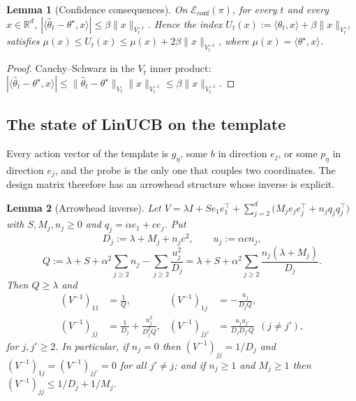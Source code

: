 \documentclass{article}
\newtheorem{lemma}{Lemma}
\theoremstyle{definition}
\theoremstyle{remark}
\newcommand{\R}{\mathbb{R}}
\theoremstyle{remark}
\begin{document}
\begin{lemma}[Confidence consequences]
\label{lem:cat-conf}
On $\mathcal E_{\mathrm{conf}}(\pi)$, for every $t$ and every $x\in\R^d$,
$|\langle\widehat\theta_t-\theta^\star,x\rangle|\le\beta\|x\|_{V_t^{-1}}$.
Hence the index $U_t(x):=\langle\widehat\theta_t,x\rangle+\beta\|x\|_{V_t^{-1}}$
satisfies $\mu(x)\le U_t(x)\le\mu(x)+2\beta\|x\|_{V_t^{-1}}$, where
$\mu(x)=\langle\theta^\star,x\rangle$.
\end{lemma}

\begin{proof}
Cauchy--Schwarz in the $V_t$ inner product:
$|\langle\widehat\theta_t-\theta^\star,x\rangle|\le\|\widehat\theta_t-\theta^\star\|_{V_t}\|x\|_{V_t^{-1}}\le\beta\|x\|_{V_t^{-1}}$.
\end{proof}

\subsection{The state of LinUCB on the template}

Every action vector of the template is $g_\eta$, some $b$ in direction $e_j$,
or some $p_\eta$ in direction $e_j$, and the probe is the only one that couples
two coordinates. The design matrix therefore has an arrowhead structure whose
inverse is explicit.

\begin{lemma}[Arrowhead inverse]
\label{lem:arrowhead}
Let $V=\lambda I+Se_1e_1^\top+\sum_{j=2}^{d}\bigl(M_je_je_j^\top+n_jq_jq_j^\top\bigr)$
with $S,M_j,n_j\ge0$ and $q_j=\alpha e_1+ce_j$. Put
\[
D_j:=\lambda+M_j+n_jc^2,\qquad u_j:=\alpha cn_j,
\]
\[
Q:=\lambda+S+\alpha^2\sum_{j\ge2}n_j-\sum_{j\ge2}\frac{u_j^2}{D_j}
=\lambda+S+\alpha^2\sum_{j\ge2}\frac{n_j(\lambda+M_j)}{D_j}.
\]
Then $Q\ge\lambda$ and
\begin{align*}
(V^{-1})_{11}&=\frac1Q,&
(V^{-1})_{1j}&=-\frac{u_j}{D_jQ},\\
(V^{-1})_{jj}&=\frac1{D_j}+\frac{u_j^2}{D_j^2Q},&
(V^{-1})_{jj'}&=\frac{u_ju_{j'}}{D_jD_{j'}Q}\ \ (j\ne j'),
\end{align*}
for $j,j'\ge2$. In particular, if $n_j=0$ then
$(V^{-1})_{jj}=1/D_j$ and $(V^{-1})_{1j}=(V^{-1})_{jj'}=0$ for all $j'\ne j$; and
if $n_j\ge1$ and $M_j\ge1$ then $(V^{-1})_{jj}\le 1/D_j+1/M_j$.
\end{lemma}
\end{document}
